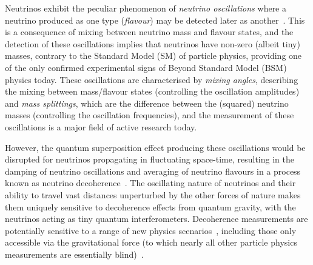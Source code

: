 \documentclass[a4paper,11pt]{article}
\begin{document}
Neutrinos exhibit the peculiar phenomenon of \textit{neutrino oscillations} where a neutrino produced as one type (\textit{flavour}) may be detected later as another~\cite{Fukuda:1998mi, Ahmad:2001an,Ahmad:2002jz}. This is a consequence of mixing between neutrino mass and flavour states, and the detection of these oscillations implies that neutrinos have non-zero (albeit tiny) masses, contrary to the Standard Model (SM) of particle physics, providing one of the only confirmed experimental signs of Beyond Standard Model (BSM) physics today. These oscillations are characterised by \textit{mixing angles}, describing the mixing between mass/flavour states (controlling the oscillation amplitudes) and \textit{mass splittings}, which are the difference between the (squared) neutrino masses (controlling the oscillation frequencies), and the measurement of these oscillations is a major field of active research today.

However, the quantum superposition effect producing these oscillations would be disrupted for neutrinos propagating in fluctuating space-time, resulting in the damping of neutrino oscillations and averaging of neutrino flavours in a process known as neutrino decoherence~\cite{Benatti_2000, PhysRevLett.85.1166}. The oscillating nature of neutrinos and their ability to travel vast distances unperturbed by the other forces of nature makes them uniquely sensitive to decoherence effects from quantum gravity, with the neutrinos acting as tiny quantum interferometers. Decoherence measurements are potentially sensitive to a range of new physics scenarios~\cite{Mavromatos2010, AmelinoCamelia:2008qg, Perlman_2015, Harlow:2018jwu, Hellmann:2021jyz, 1909.11271, EPJC802020, Capozzi:2018bps, 1904.02518}, including those only accessible via the gravitational force (to which nearly all other particle physics measurements are essentially blind)~\cite{Hellmann:2021jyz}.
\end{document}
